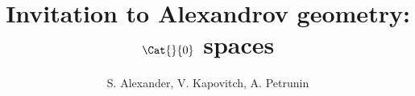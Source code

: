 \documentclass[twoside]{book}
\begin{document}
\frontmatter
\title{Invitation to Alexandrov geometry: $\Cat{}{0}$ spaces}
\author{S. Alexander, V. Kapovitch, A. Petrunin}
\maketitle
\thispagestyle{empty}
\newpage
\tableofcontents







{\small

}

\end{document}
